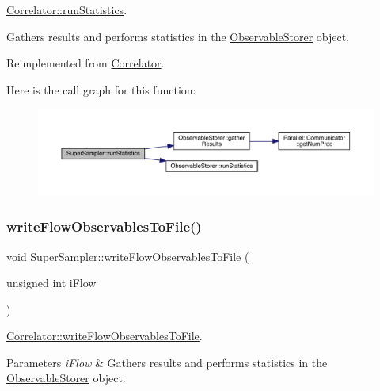 \mbox{\hyperlink{class_correlator_a35197b1d12b62ef30b79c0138a26456e}{Correlator\+::run\+Statistics}}. 

Gathers results and performs statistics in the \mbox{\hyperlink{class_observable_storer}{Observable\+Storer}} object. 

Reimplemented from \mbox{\hyperlink{class_correlator_a35197b1d12b62ef30b79c0138a26456e}{Correlator}}.

Here is the call graph for this function\+:
\nopagebreak
\begin{figure}[H]
\begin{center}
\leavevmode
\includegraphics[width=350pt]{class_super_sampler_af96f7d461e9159adb4eef9bda9c6ecde_cgraph}
\end{center}
\end{figure}
\mbox{\label{class_super_sampler_a410b650ebccdb03519c88908a3a8013e}} 
\subsubsection{\texorpdfstring{writeFlowObservablesToFile()}{writeFlowObservablesToFile()}}
{\footnotesize\ttfamily void Super\+Sampler\+::write\+Flow\+Observables\+To\+File (\begin{DoxyParamCaption}\item[{unsigned int}]{i\+Flow }\end{DoxyParamCaption})\hspace{0.3cm}{\ttfamily [virtual]}}



\mbox{\hyperlink{class_correlator_a168512b2ce182d9478db47f100125fa6}{Correlator\+::write\+Flow\+Observables\+To\+File}}. 


\begin{DoxyParams}{Parameters}
{\em i\+Flow} & Gathers results and performs statistics in the \mbox{\hyperlink{class_observable_storer}{Observable\+Storer}} object. \\
\hline
\end{DoxyParams}


